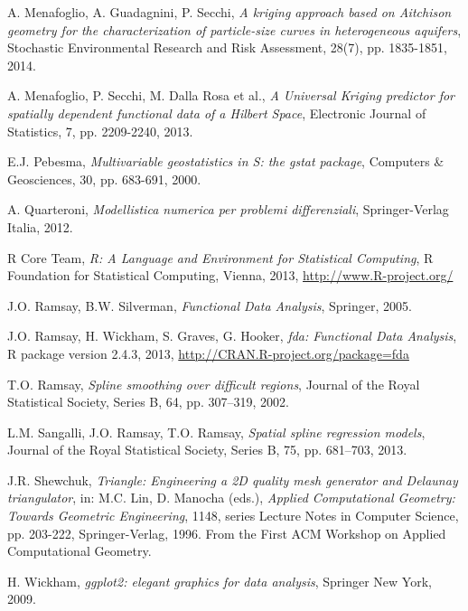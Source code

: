 \documentclass[a4paper,11pt,twoside,openright]{book}							%
\begin{document}
\begin{thebibliography}{99}
A. Menafoglio, A. Guadagnini, P. Secchi, \emph{A kriging approach based on Aitchison geometry for the characterization of particle-size curves in heterogeneous aquifers}, Stochastic Environmental Research and Risk Assessment, 28(7), pp. 1835-1851, 2014.

A. Menafoglio, P. Secchi, M. Dalla Rosa et al., \emph{A Universal Kriging predictor for spatially dependent functional data of a Hilbert Space}, Electronic Journal of Statistics, 7, pp. 2209-2240, 2013.

E.J. Pebesma, \emph{Multivariable geostatistics in S: the gstat package}, Computers \& Geosciences, 30, pp. 683-691, 2000.

A. Quarteroni, \emph{Modellistica numerica per problemi differenziali}, Springer-Verlag Italia, 2012.

R Core Team, \emph{R: A Language and Environment for Statistical Computing}, R Foundation for Statistical Computing, Vienna, 2013, \href{http://www.R-project.org/}{http://www.R-project.org/}

J.O. Ramsay, B.W. Silverman, \emph{Functional Data Analysis}, Springer, 2005.

J.O. Ramsay, H. Wickham, S. Graves, G. Hooker, \emph{fda: Functional Data Analysis}, R package version 2.4.3, 2013, \href{http://CRAN.R-project.org/package=fda}{http://CRAN.R-project.org/package=fda}

T.O. Ramsay, \emph{Spline smoothing over difficult regions}, Journal of the Royal Statistical Society, Series B, 64, pp. 307–319, 2002.

L.M. Sangalli, J.O. Ramsay, T.O. Ramsay, \emph{Spatial spline regression models}, Journal of the Royal Statistical Society, Series B, 75, pp. 681–703, 2013.

J.R. Shewchuk, \emph{Triangle: Engineering a 2D quality mesh generator and Delaunay triangulator}, in: M.C. Lin, D. Manocha (eds.), \emph{Applied Computational Geometry: Towards Geometric Engineering}, 1148, series Lecture Notes in Computer Science, pp. 203-222, Springer-Verlag, 1996. From the First ACM Workshop on Applied Computational Geometry.

H. Wickham, \emph{ggplot2: elegant graphics for data analysis}, Springer New York, 2009.


\end{thebibliography}
\end{document}
